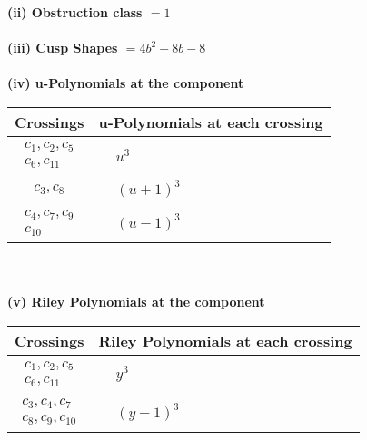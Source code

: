 \documentclass[1p]{elsarticle_modified}
\theoremstyle{definition}
\begin{document}
\flushleft \textbf{(ii) Obstruction class $= 1$}\\~\\
\flushleft \textbf{(iii) Cusp Shapes $= 4 b^2+8 b-8$}\\~\\
\newpage\renewcommand{\arraystretch}{1}
\flushleft \textbf{(iv) u-Polynomials at the component}\newline \\
\begin{tabular}{m{50pt}|m{274pt}}
Crossings & \hspace{64pt}u-Polynomials at each crossing \\
\hline $$\begin{aligned}c_{1},c_{2},c_{5}\\c_{6},c_{11}\end{aligned}$$&$\begin{aligned}
&u^3
\end{aligned}$\\
\hline $$\begin{aligned}c_{3},c_{8}\end{aligned}$$&$\begin{aligned}
&(u+1)^3
\end{aligned}$\\
\hline $$\begin{aligned}c_{4},c_{7},c_{9}\\c_{10}\end{aligned}$$&$\begin{aligned}
&(u-1)^3
\end{aligned}$\\
\hline
\end{tabular}\\~\\
\newpage\renewcommand{\arraystretch}{1}
\flushleft \textbf{(v) Riley Polynomials at the component}\newline \\
\begin{tabular}{m{50pt}|m{274pt}}
Crossings & \hspace{64pt}Riley Polynomials at each crossing \\
\hline $$\begin{aligned}c_{1},c_{2},c_{5}\\c_{6},c_{11}\end{aligned}$$&$\begin{aligned}
&y^3
\end{aligned}$\\
\hline $$\begin{aligned}c_{3},c_{4},c_{7}\\c_{8},c_{9},c_{10}\end{aligned}$$&$\begin{aligned}
&(y-1)^3
\end{aligned}$\\
\hline
\end{tabular}\\~\\
\end{document}
